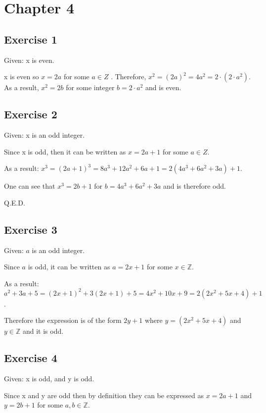\documentclass[a4paper]{article}
\begin{document}
\section{Chapter 4}

\subsection{Exercise 1}

Given: x is even.

x is even so $x = 2a$ for some $ a \in Z $ . Therefore,
$ x^2 = (2a)^2 = 4a^2 = 2\cdot(2\cdot a^2)$. As a result, $x^2 = 2b$
for some integer $b = 2 \cdot a^2 $ and is even.

\subsection{Exercise 2}

Given: x is an odd integer.

Since x is odd, then it can be written as $x = 2a+1$ for some $a \in Z$.

As a result:
$x^3 = (2a+1)^3 = 8a^3 + 12a^2 + 6a + 1 = 2\left(4a^3+6a^2+3a\right) + 1 $.

One can see that $x^3 = 2b+1$ for $b = 4a^3+6a^2+3a$ and is therefore odd.

Q.E.D.

\subsection{Exercise 3}

Given: $a$ is an odd integer.

Since $a$ is odd, it can be written as $a = 2x+1$ for some $x \in \mathbb{Z}$.

As a result: $a^2 + 3a + 5 = (2x+1)^2 + 3(2x+1) + 5 = 4x^2+10x+9 =
2\left(2x^2+5x+4\right) + 1$ .

Therefore the expression is of the form $2y+1$ where
$y = \left(2x^2+5x+4\right)$ and $y \in \mathbb{Z}$ and it is odd.

\subsection{Exercise 4}

Given: x is odd, and y is odd.

Since x and y are odd then by definition they can be expressed as $ x = 2a+1 $
and $ y = 2b+1$ for some $ a, b \in \mathbb{Z} $.
\end{document}
